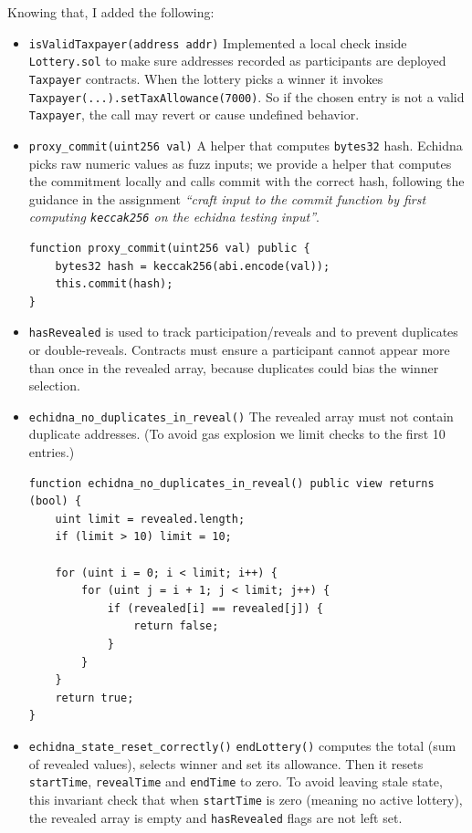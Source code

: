 Knowing that, I added the following:
\begin{itemize}
    \item \texttt{isValidTaxpayer(address addr)} Implemented a local check inside \texttt{Lottery.sol} to make sure addresses recorded as participants are deployed \texttt{Taxpayer} contracts. When the lottery picks a winner it invokes \texttt{Taxpayer(...).setTaxAllowance(7000)}. So if the chosen entry is not a valid \texttt{Taxpayer}, the call may revert or cause undefined behavior.
    
    \item \texttt{proxy\_commit(uint256 val)} A helper that computes \texttt{bytes32} hash. Echidna picks raw numeric values as fuzz inputs; we provide a helper that computes the commitment locally and calls commit with the correct hash, following the guidance in the assignment \textit{“craft input to the commit function by first computing \texttt{keccak256} on the echidna testing input”}.

    \begin{lstlisting}
function proxy_commit(uint256 val) public {
    bytes32 hash = keccak256(abi.encode(val));
    this.commit(hash);
}
    \end{lstlisting}

    \item \texttt{hasRevealed} is used to track participation/reveals and to prevent duplicates or double-reveals. Contracts must ensure a participant cannot appear more than once in the revealed array, because duplicates could bias the winner selection.

    \item \texttt{echidna\_no\_duplicates\_in\_reveal()} The revealed array must not contain duplicate addresses. (To avoid gas explosion we limit checks to the first 10 entries.)

\begin{lstlisting}
function echidna_no_duplicates_in_reveal() public view returns (bool) {
    uint limit = revealed.length;
    if (limit > 10) limit = 10;

    for (uint i = 0; i < limit; i++) {
        for (uint j = i + 1; j < limit; j++) {
            if (revealed[i] == revealed[j]) {
                return false;
            }
        }
    }
    return true;
}
\end{lstlisting}
    
    \item \texttt{echidna\_state\_reset\_correctly()} \texttt{endLottery()} computes the total (sum of revealed values), selects winner and set its allowance. Then it resets \texttt {startTime}, \texttt{revealTime} and \texttt{endTime} to zero. To avoid leaving stale state, this invariant check that when \texttt{startTime} is zero (meaning no active lottery), the revealed array is empty and \texttt{hasRevealed} flags are not left set.


\end{itemize}
